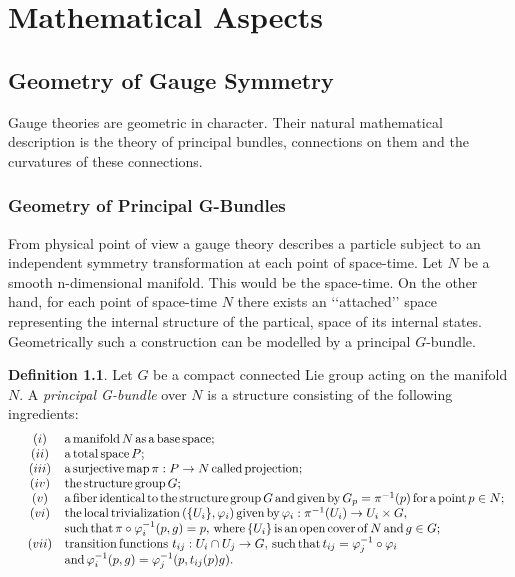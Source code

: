 \documentclass[11pt]{report}
\theoremstyle{plain}
\theoremstyle{definition}
\newtheorem{defn}[thm]{Definition}
\theoremstyle{remark}
\theoremstyle{remark}
\numberwithin{equation}{section}
\begin{document}
\chapter{Mathematical Aspects}


\section{Geometry of Gauge Symmetry}

Gauge theories are geometric in character. Their natural mathematical description is the theory of principal bundles, connections on them and the curvatures of these connections. 

\subsection{Geometry of Principal G-Bundles}
From physical point of view a gauge theory describes a particle subject to an independent symmetry transformation at each point of space-time. Let $N$ be a smooth n-dimensional manifold. This would be the space-time. On the other hand, for each point of space-time $N$ there exists an \lq\lq{}attached\rq\rq{} space representing the internal structure of the partical, space of its internal states. Geometrically such a construction can be modelled by a principal $G$-bundle. 

\begin{defn}
Let $G$ be a compact connected Lie group acting on the manifold $N$. A \textit{principal G-bundle} over $N$ is a structure consisting of the following ingredients:
\[\begin{array}{lcl}
&(i)& {\rm a \, manifold} \, N \, {\rm as \, a \, base \, space;} \\
&(ii)& {\rm a \, total \, space} \, P; \\
&(iii)& {\rm a \, surjective \, map} \, \pi: P \to N \, {\rm called \, projection};\\
&(iv)& {\rm the \, structure \, group} \, G; \\
&(v)&{\rm a \, fiber \, identical \, to \, the \, structure \, group} \, G \, {\rm and \, given \, by} \, G_p = \pi^{-1}(p) \, {\rm for \, a \, point} \, p\in N;\\
&(vi)& {\rm the \, local \, trivialization} \, (\{U_i\}, \varphi_i) \, {\rm given \, by} \, \varphi_i: \pi^{-1}(U_i) \to U_i \times G, \\
& & {\rm such \, that} \, \pi \circ \varphi^{-1}_i(p, g) = p, \,  {\rm where} \, \{U_i\} \, {\rm is \, an \, open \, cover \, of} \, N \, {\rm and} \, g \in G;\\
&(vii)& {\rm transition \, functions} \, \, t_{ij}: U_i\cap U_j \to G, \, {\rm such \, that} \, t_{ij} = \varphi^{-1}_j\circ \varphi_i \\
& & {\rm and} \, \varphi^{-1}_i(p, g) = \varphi^{-1}_j(p, t_{ij}(p)g).\\
\end{array}\]

\end{defn}
\end{document}
